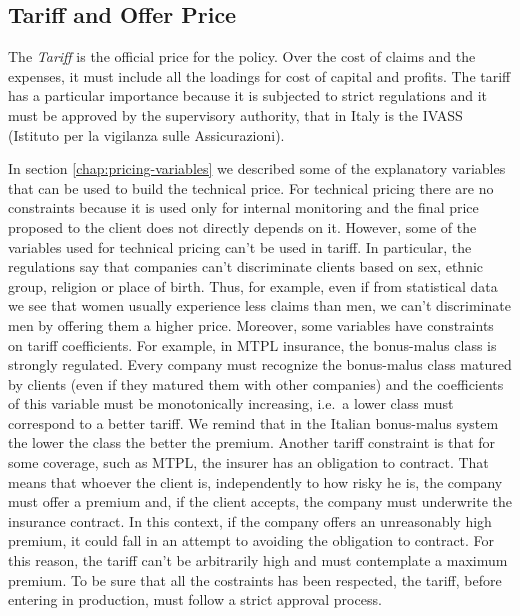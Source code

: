 \documentclass[a4paper, nobind]{templates/ociamthesis}
\theoremstyle{definition}
\theoremstyle{definition}
\theoremstyle{definition}
\theoremstyle{remark}
\begin{document}
\hypertarget{tariff-and-offer-price}{%
\subsection{Tariff and Offer Price}\label{tariff-and-offer-price}}

The \emph{Tariff} is the official price for the policy. Over the cost of claims and the expenses, it must include all the loadings for cost of capital and profits. The tariff has a particular importance because it is subjected to strict regulations and it must be approved by the supervisory authority, that in Italy is the IVASS (Istituto per la vigilanza sulle Assicurazioni).

In section \ref{chap:pricing-variables} we described some of the explanatory variables that can be used to build the technical price. For technical pricing there are no constraints because it is used only for internal monitoring and the final price proposed to the client does not directly depends on it. However, some of the variables used for technical pricing can't be used in tariff. In particular, the regulations say that companies can't discriminate clients based on sex, ethnic group, religion or place of birth. Thus, for example, even if from statistical data we see that women usually experience less claims than men, we can't discriminate men by offering them a higher price. Moreover, some variables have constraints on tariff coefficients. For example, in MTPL insurance, the bonus-malus class is strongly regulated. Every company must recognize the bonus-malus class matured by clients (even if they matured them with other companies) and the coefficients of this variable must be monotonically increasing, i.e.~a lower class must correspond to a better tariff. We remind that in the Italian bonus-malus system the lower the class the better the premium. Another tariff constraint is that for some coverage, such as MTPL, the insurer has an obligation to contract. That means that whoever the client is, independently to how risky he is, the company must offer a premium and, if the client accepts, the company must underwrite the insurance contract. In this context, if the company offers an unreasonably high premium, it could fall in an attempt to avoiding the obligation to contract. For this reason, the tariff can't be arbitrarily high and must contemplate a maximum premium. To be sure that all the costraints has been respected, the tariff, before entering in production, must follow a strict approval process.
\end{document}
